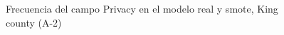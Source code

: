 \begin{figure}[H]
    \centering
    
    \caption{Frecuencia del campo Privacy en el modelo real y smote, King county (A-2)}
    \label{frecuency-smote-privacy}
\end{figure}